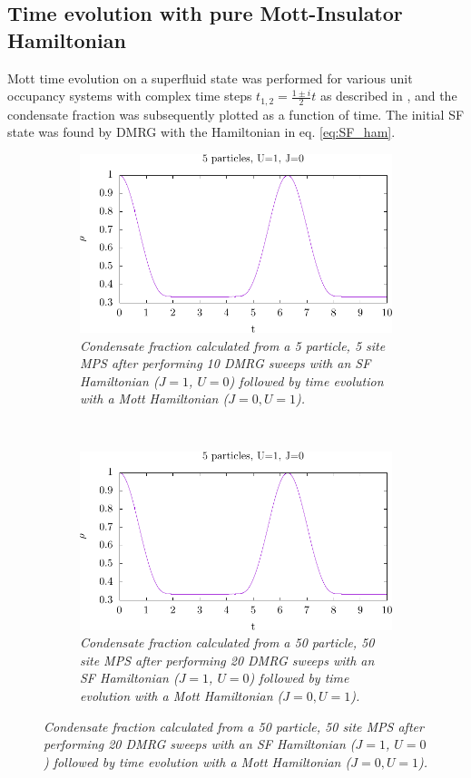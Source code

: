 \subsection{Time evolution with pure Mott-Insulator Hamiltonian}
Mott time evolution on a superfluid state was performed for various unit occupancy systems with complex time steps $t_{1,2}=\frac{1\pm i}{2}t$ as described in \cite{cmplx_t}, and the condensate fraction was subsequently plotted as a function of time. The initial SF state was found by DMRG with the Hamiltonian in eq. \eqref{eq:SF_ham}.
\begin{figure}[h!]
    \centering
    \begin{subfigure}[t]{0.49\textwidth}
        \includegraphics[width=\textwidth]{Figures/TimeEvo5_U1_J0.pdf}
        \caption{\textit{Condensate fraction calculated from a 5 particle, 5 site MPS after performing 10 DMRG sweeps with an SF Hamiltonian ($J=1$, $U=0$) followed by time evolution with a Mott Hamiltonian ($J=0, U=1$).}}
        \label{fig:TimeEvo5_U1_J0}
    \end{subfigure}
    ~
    \begin{subfigure}[t]{0.49\textwidth}
        \includegraphics[width=\textwidth]{Figures/TimeEvo50_U1_J0.pdf}
        \caption{\textit{Condensate fraction calculated from a 50 particle, 50 site MPS after performing 20 DMRG sweeps with an SF Hamiltonian ($J=1$, $U=0$) followed by time evolution with a Mott Hamiltonian ($J=0, U=1$).}}
        \label{fig:TimeEvo50_U1_J0}
    \end{subfigure}    
\end{figure}
